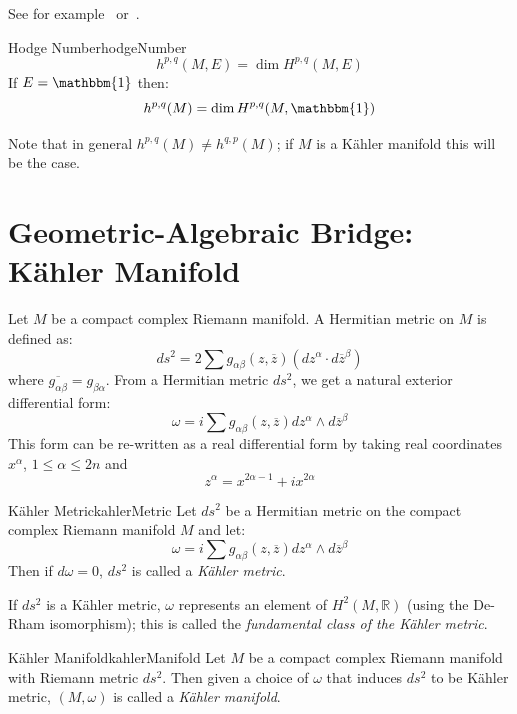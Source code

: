 \documentclass{book}
\newcommand{\R}{{\mathbb{R}}}
\begin{document}
\begin{Proof}
  See for example~\cite{HodgeTheory2014} or~\cite{voisinHodgeTheoryComplex2002}.
\end{Proof}

\begin{defn}{Hodge Number}{hodgeNumber}
  \[
    h^{p,q}(M,E) = \dim H^{p,q}(M,E)
  \]
  If $E = \mathbbm{1}$ then:
  \[
    h^{p,q}(M) = \dim H^{p,q}(M,\mathbbm{1})
  \]
\end{defn}

Note that in general $h^{p,q}(M) \ne h^{q,p}(M)$; if $M$ is a K\"ahler manifold this will be the case.


\section{Geometric-Algebraic Bridge: K\"ahler Manifold}\label{sec:kahlerMan}

Let $M$ be a compact complex Riemann manifold. A Hermitian metric on $M$ is defined as:
\[
  ds^2 = 2 \sum g_{\alpha\beta}(z, \overline{z}) (dz^\alpha \cdot d \overline{z}^\beta)
\]
where $\overline{g_{\alpha\beta}} = g_{\beta\alpha}$. From a Hermitian metric $ds^2$, we get a natural exterior
differential form:
\[
  \omega = i\sum g_{\alpha\beta}(z, \overline{z}) dz^\alpha \wedge  d \overline{z}^\beta
\]
This form can be re-written as a real differential form by taking real coordinates $x^\alpha$, $1 \le \alpha
\le 2n$ and
\[
  z^\alpha = x^{2\alpha-1} + ix^{2\alpha}
\]
\begin{defn}{K\"ahler Metric}{kahlerMetric}
  Let $ds^2$ be a Hermitian metric on the compact complex Riemann manifold $M$ and let:
  \[
    \omega = i\sum g_{\alpha\beta}(z, \overline{z}) dz^\alpha \wedge  d \overline{z}^\beta
  \]
  Then if $d\omega = 0$, $ds^2$ is called a \emph{K\"ahler metric}.
\end{defn}

If $ds^2$ is a K\"ahler metric, $\omega$ represents an element of $H^2(M, \R)$ (using the De-Rham
isomorphism); this is called the \emph{fundamental class of the K\"ahler metric}.

\begin{defn}{K\"ahler Manifold}{kahlerManifold}
  Let $M$ be a compact complex Riemann manifold with Riemann metric $ds^2$. Then given a choice of $\omega$ that
  induces $ds^2$ to be K\"ahler metric, $(M, \omega)$ is called a \emph{K\"ahler manifold}.
\end{defn}
\end{document}
